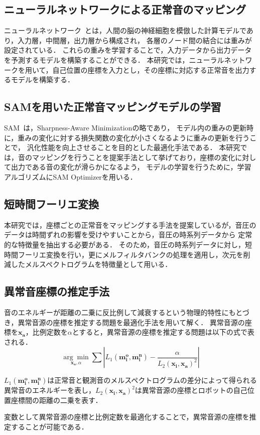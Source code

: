 \documentclass[../main]{subfiles}
\begin{document}
\subsection{ニューラルネットワークによる正常音のマッピング}
ニューラルネットワーク~\cite{Rumelhart1986}とは，人間の脳の神経細胞を模倣した計算モデルであり，入力層，中間層，出力層から構成され，
各層のノード間の結合には重みが設定されている．
これらの重みを学習することで，入力データから出力データを予測するモデルを構築することができる．
本研究では，ニューラルネットワークを用いて，自己位置の座標を入力とし，その座標に対応する正常音を出力するモデルを構築する．
\subsection{SAMを用いた正常音マッピングモデルの学習}
SAM~\cite{Foret2020}は，Sharpness-Aware Minimizationの略であり，
モデル内の重みの更新時に，重みの変化に対する損失関数の変化が小さくなるように重みの更新を行うことで，
汎化性能を向上させることを目的とした最適化手法である．
本研究では，音のマッピングを行うことを提案手法として挙げており，座標の変化に対して出力である音の変化が滑らかになるよう，
モデルの学習を行うために，学習アルゴリズムにSAM Optimizerを用いる．
\subsection{短時間フーリエ変換}
本研究では，座標ごとの正常音をマッピングする手法を提案しているが，音圧のデータは時間ずれの影響を受けやすいことから，音圧の時系列データから
定常的な特徴量を抽出する必要がある．
そのため，音圧の時系列データに対し，短時間フーリエ変換を行い，更にメルフィルタバンクの処理を適用し，次元を削減したメルスペクトログラムを特徴量として用いる．
\subsection{異常音座標の推定手法}
音のエネルギーが距離の二乗に反比例して減衰するという物理的特性にもとづき，異常音源の座標を推定する問題を最適化手法を用いて解く．
異常音源の座標を$\mathbf{x_a}$，比例定数を$\alpha$とすると，異常音源の座標を推定する問題は以下の式で表される．
\begin{equation}
  \underset{\mathbf{x_a}, \alpha}{\arg\min} \sum \left| L_1 (\mathbf{m_i^o}, \mathbf{m_i^n}) - \frac{\alpha}{L_2 (\mathbf{x_i}, \mathbf{x_a})^2} \right|
\end{equation}

$L_1 (\mathbf{m_i^o}, \mathbf{m_i^n})$は正常音と観測音のメルスペクトログラムの差分によって得られる異常音のエネルギーを表し，$L_2 (\mathbf{x_i}, \mathbf{x_a})^2$は異常音源の座標とロボットの自己位置座標間の距離の二乗を表す．

変数として異常音源の座標と比例定数を最適化することで，異常音源の座標を推定することが可能である．
\end{document}
